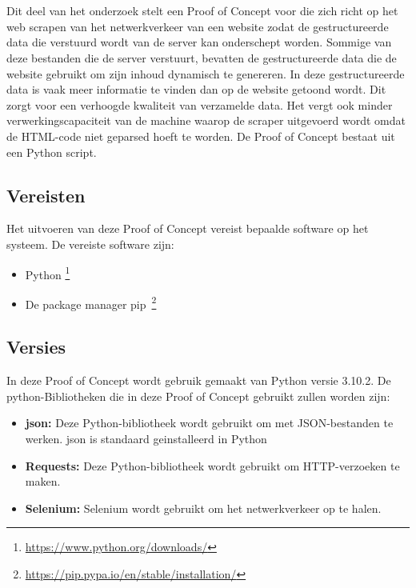 \chapter{}%
\label{ch:proof-of-concept}

Dit deel van het onderzoek stelt een Proof of Concept voor die zich richt op het web scrapen van het netwerkverkeer van een website zodat de gestructureerde data die verstuurd wordt van de server kan onderschept worden. Sommige van deze bestanden die de server verstuurt, bevatten de gestructureerde data die de website gebruikt om zijn inhoud dynamisch te genereren. In deze gestructureerde data is vaak meer informatie te vinden dan op de website getoond wordt. Dit zorgt voor een verhoogde kwaliteit van verzamelde data. Het vergt ook minder verwerkingscapaciteit van de machine waarop de scraper uitgevoerd wordt omdat de HTML-code niet geparsed hoeft te worden. De Proof of Concept bestaat uit een Python script.

\section{Vereisten}
Het uitvoeren van deze Proof of Concept vereist bepaalde software op het systeem. De vereiste software zijn:
\begin{itemize}
    \item Python \footnote{\url{https://www.python.org/downloads/}}
    \item De package manager pip~\footnote{\url{https://pip.pypa.io/en/stable/installation/}}
\end{itemize}

\section{Versies}
In deze Proof of Concept wordt gebruik gemaakt van Python versie 3.10.2. De python-Bibliotheken die in deze Proof of Concept gebruikt zullen worden zijn:

\begin{itemize}
    \item \textbf{json: } Deze Python-bibliotheek wordt gebruikt om met JSON-bestanden te werken. json is standaard geinstalleerd in Python

    \item \textbf{Requests: } Deze Python-bibliotheek wordt gebruikt om HTTP-verzoeken te maken.

    \item \textbf{Selenium: } Selenium wordt gebruikt om het netwerkverkeer op te halen.
\end{itemize}

